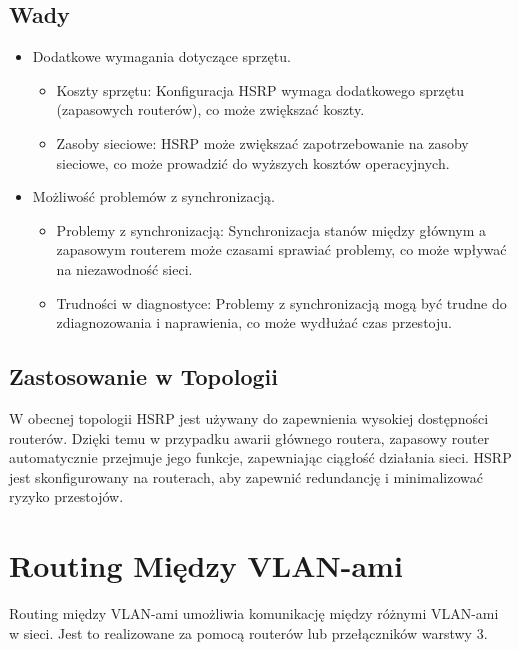 \subsection{Wady}
\begin{itemize}
    \item Dodatkowe wymagania dotyczące sprzętu.
    \begin{itemize}
        \item Koszty sprzętu: Konfiguracja HSRP wymaga dodatkowego sprzętu (zapasowych routerów), co może zwiększać koszty.
        \item Zasoby sieciowe: HSRP może zwiększać zapotrzebowanie na zasoby sieciowe, co może prowadzić do wyższych kosztów operacyjnych.
    \end{itemize}
    \item Możliwość problemów z synchronizacją.
    \begin{itemize}
        \item Problemy z synchronizacją: Synchronizacja stanów między głównym a zapasowym routerem może czasami sprawiać problemy, co może wpływać na niezawodność sieci.
        \item Trudności w diagnostyce: Problemy z synchronizacją mogą być trudne do zdiagnozowania i naprawienia, co może wydłużać czas przestoju.
    \end{itemize}
\end{itemize}

\subsection{Zastosowanie w Topologii}
W obecnej topologii HSRP jest używany do zapewnienia wysokiej dostępności routerów. Dzięki temu w przypadku awarii głównego routera, zapasowy router automatycznie przejmuje jego funkcje, zapewniając ciągłość działania sieci. HSRP jest skonfigurowany na routerach, aby zapewnić redundancję i minimalizować ryzyko przestojów.

\section{Routing Między VLAN-ami}

Routing między VLAN-ami umożliwia komunikację między różnymi VLAN-ami w sieci. Jest to realizowane za pomocą routerów lub przełączników warstwy 3.

